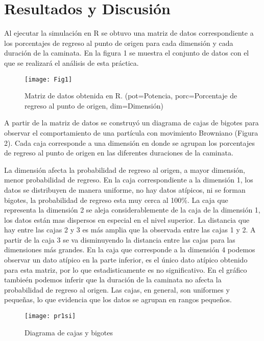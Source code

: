 ﻿\documentclass{article}
\begin{document}
\section{Resultados y Discusi\'on}\label{res}

Al ejecutar la simulaci\'on en R se obtuvo una matriz de datos correspondiente a los porcentajes de regreso al punto de origen para cada dimensi\'on y cada duraci\'on de la caminata.  En la figura 1 se muestra el conjunto de datos con el que se realizar\'a el an\'alisis de esta pr\'actica.

\graphicspath{ {c:/Users/User/Desktop/CITP/Simulacion/R/} }
\begin{figure}[h]
  \texttt{[image: Fig1]}
  \caption{Matriz de datos obtenida en R.  (pot=Potencia, porc=Porcentaje de regreso al punto de origen, dim=Dimensi\'on)}
  \label{Figura 1}
\end{figure}

A partir de la matriz de datos se construy\'o un diagrama de cajas de bigotes para observar el comportamiento de una part\'icula con movimiento Browniano (Figura 2).  Cada caja corresponde a una dimensi\'on en donde se agrupan los porcentajes de regreso al punto de origen en las diferentes duraciones de la caminata.


La dimensi\'on afecta la probabilidad de regreso al origen, a mayor dimensi\'on, menor probabilidad de regreso.  En la caja correspondiente a la dimensi\'on 1, los datos se distribuyen de manera uniforme, no hay datos at\'ipicos, ni se forman bigotes, la probabilidad de regreso esta muy cerca al 100\%.  La caja que representa la dimensi\'on 2 se aleja considerablemente de la caja de la dimensi\'on 1, los datos est\'an mas dispersos en especial en el nivel superior.  La distancia que hay entre las cajas 2 y 3 es m\'as amplia que la observada entre las cajas 1 y 2.  A partir de la caja 3 se va disminuyendo la distancia entre las cajas para las dimensiones m\'as grandes.  En la caja que corresponde a la dimensi\'on 4 podemos observar un dato at\'ipico en la parte inferior, es el \'unico dato at\'ipico obtenido para esta matriz, por lo que estadisticamente es no significativo.  
En el gr\'afico tambie\'en podemos inferir que la duraci\'on de la caminata no afecta la probabilidad de regreso al origen.  Las cajas, en general, son uniformes y peque\~nas, lo que evidencia que los datos se agrupan en rangos peque\~nos.

\graphicspath{ {c:/Users/User/Desktop/CITP/Simulacion/R/} }
\begin{figure}[H]
  \texttt{[image: pr1si]}
  \caption{Diagrama de cajas y bigotes}
  \label{Figura 2}
\end{figure}
\end{document}
